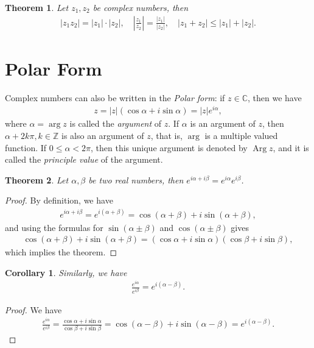 \documentclass[11pt]{book}
\newtheorem{theorem}{Theorem}[chapter]
\newtheorem{corollary}{Corollary}[theorem]
\theoremstyle{definition}
\numberwithin{equation}{chapter}
\begin{document}
\medskip

\begin{theorem}
Let $z_1, z_2$ be complex numbers, then 
\begin{align*}
    \left|z_1 z_2\right| = \left|z_1\right| \cdot \left|z_2\right|, \quad \left|\frac{z_1}{z_2}\right| = \frac{\left|z_1\right|}{\left|z_2\right|}, \quad \left|z_1 + z_2\right| \leq \left|z_1\right| + \left|z_2\right|.
\end{align*}
\end{theorem}

\section{Polar Form}

Complex numbers can also be written in the {\it Polar form}: if $z \in \mathbb{C}$, then we have
\begin{align*}
    z = \left|z\right| \left(\cos \alpha + i \sin \alpha\right) = \left|z\right| e^{i \alpha},
\end{align*}
where $\alpha = \arg z$ is called the {\it argument} of $z$. If $\alpha$ is an argument of $z$, then $\alpha + 2k\pi, k \in \mathbb{Z}$ is also an argument of $z$, that is, $\arg$ is a multiple valued function. If $0 \leq \alpha < 2\pi$, then this unique argument is denoted by $\operatorname{Arg} z$, and it is called the {\it principle value} of the argument. 

\medskip

\begin{theorem}
Let $\alpha, \beta$ be two real numbers, then $e^{i\alpha + i \beta} = e^{i\alpha} e^{i\beta}$.
\end{theorem}
\begin{proof}
By definition, we have
\begin{align*}
    e^{i\alpha + i \beta} = e^{i(\alpha + \beta)} = \cos(\alpha + \beta) + i \sin(\alpha + \beta),
\end{align*}
and using the formulas for $\sin(\alpha \pm \beta)$ and $\cos(\alpha \pm \beta)$ gives
\begin{align*}
    \cos(\alpha + \beta) + i \sin(\alpha + \beta) = \left(\cos \alpha + i \sin \alpha\right) \left(\cos \beta + i \sin \beta\right),
\end{align*}
which implies the theorem.
\end{proof}

\medskip

\begin{corollary}
Similarly, we have
\begin{align*}
    \frac{e^{i\alpha}}{e^{i\beta}} = e^{i(\alpha - \beta)}.
\end{align*}
\end{corollary}
\begin{proof}
We have
\begin{align*}
    \frac{e^{i\alpha}}{e^{i\beta}} = \frac{\cos \alpha + i \sin \alpha}{\cos \beta + i \sin \beta} = \cos(\alpha - \beta) + i \sin(\alpha - \beta) = e^{i(\alpha - \beta)}.
\end{align*}
\end{proof}
\end{document}
